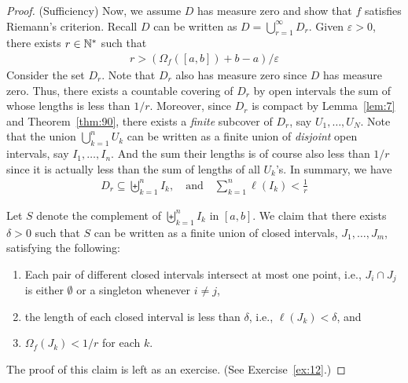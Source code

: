 \documentclass[thmcnt=section, 12pt]{my-elegantbook}
\begin{document}
\begin{proof}
	(Sufficiency)
	Now, we assume $D$ has measure zero and 
	show that $f$ satisfies Riemann's criterion.
	Recall $D$ can be written as $D = \bigcup_{r=1}^\infty D_r$.
	Given $\varepsilon > 0$,
	there exists $r \in \mathbb{N}^\ast$ such that 
	\begin{align}
		r > (\Omega_f([a,b]) + b - a) / \varepsilon
		\label{eq:148}
	\end{align}
	Consider the set $D_r$.
	Note that $D_r$ also has measure zero since $D$ has measure zero.
	Thus, there exists a countable covering of $D_r$ by open intervals
	the sum of whose lengths is less than $1 / r$.
	Moreover, since $D_r$ is compact by Lemma~\ref{lem:7} 
	and Theorem~\ref{thm:90},
	there exists a \textit{finite} subcover of $D_r$, 
	say $U_1, \ldots, U_N$.
	Note that the union $\bigcup_{k=1}^n U_k$ can be written as
	a finite union of \textit{disjoint} open intervals,
	say $I_1, \ldots, I_n$.
	And the sum their lengths is of course also less than $1 / r$
	since it is actually less than the sum of lengths of all $U_k$'s.
	In summary, we have
	\begin{align*}
		D_r \subseteq \biguplus_{k=1}^n I_k,
		\quad \text{and} \quad
		\sum_{k=1}^n \ell(I_k) < \frac{1}{r}
	\end{align*}

	Let $S$ denote the complement of $\biguplus_{k=1}^n I_k$ in $[a, b]$.
	We claim that there exists $\delta > 0$
	such that $S$ can be written as a finite union of 
	closed intervals, $J_1, \ldots, J_m$, satisfying the following: 
	\begin{enumerate}
		\item Each pair of different closed intervals intersect 
			at most one point, i.e., $J_i \cap J_j$
			is either $\emptyset$ or a singleton whenever $i \neq j$,  
		\item the length of each closed interval is less than $\delta$,
			i.e., $\ell(J_k) < \delta$, and 
		\item $\Omega_f(J_k) < 1 / r$ for each $k$.
	\end{enumerate}
	The proof of this claim is left as an exercise. 
	(See Exercise~\ref{ex:12}.)


\end{proof}
\end{document}
